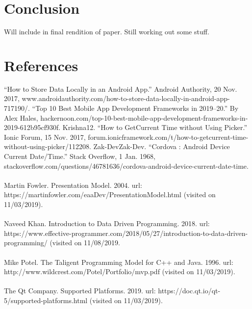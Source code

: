 \documentclass[onecolumn, draftclsnofoot,10pt, compsoc]{IEEEtran}
\begin{document}
\section{Conclusion}
Will include in final rendition of paper. Still working out some stuff.
\section{References}

“How to Store Data Locally in an Android App.” Android Authority, 20 Nov. 2017, www.androidauthority.com/how-to-store-data-locally-in-android-app-717190/.
\newline
\newline
“Top 10 Best Mobile App Development Frameworks in 2019–20.” By Alex Hales, hackernoon.com/top-10-best-mobile-app-development-frameworks-in-2019-612b95cf930f.
\newline
\newline
Krishna12. “How to GetCurrent Time without Using Picker.” Ionic Forum, 15 Nov. 2017, forum.ionicframework.com/t/how-to-getcurrent-time-without-using-picker/112208.
\newline
\newline
Zak-DevZak-Dev. “Cordova : Android Device Current Date/Time.” Stack Overflow, 1 Jan. 1968, stackoverflow.com/questions/46781636/cordova-android-device-current-date-time.
\\
\\
 Martin Fowler. Presentation Model. 2004. url: https://martinfowler.com/eaaDev/PresentationModel.html (visited on 11/03/2019).
 \\
 \\
 Naveed Khan. Introduction to Data Driven Programming. 2018. url: https://www.effective-programmer.com/2018/05/27/introduction-to-data-driven-programming/ (visited on 11/08/2019.
 \\
 \\
  Mike Potel. The Taligent Programming Model for C++ and Java. 1996. url: http://www.wildcrest.com/Potel/Portfolio/mvp.pdf (visited on 11/03/2019).
\\
\\
The Qt Company. Supported Platforms. 2019. url: https://doc.qt.io/qt-5/supported-platforms.html (visited on 11/03/2019).
\end{document}
